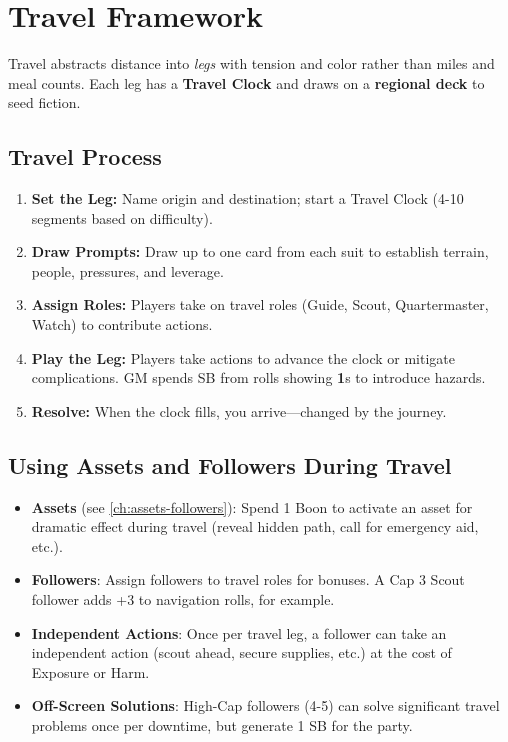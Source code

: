\section{Travel Framework}
\label{sec:travel-framework}

Travel abstracts distance into \emph{legs} with tension and color rather than miles and meal counts. Each leg has a \textbf{Travel Clock} and draws on a \textbf{regional deck} to seed fiction.

\subsection*{Travel Process}
\label{sec:travel-process}
\begin{enumerate}
\item \textbf{Set the Leg:} Name origin and destination; start a Travel Clock (4-10 segments based on difficulty).
\item \textbf{Draw Prompts:} Draw up to one card from each suit to establish terrain, people, pressures, and leverage.
\item \textbf{Assign Roles:} Players take on travel roles (Guide, Scout, Quartermaster, Watch) to contribute actions.
\item \textbf{Play the Leg:} Players take actions to advance the clock or mitigate complications. GM spends SB from rolls showing \textbf{1}s to introduce hazards.
\item \textbf{Resolve:} When the clock fills, you arrive—changed by the journey.
\end{enumerate}

\subsection*{Using Assets and Followers During Travel}
\label{sec:travel-assets}
\begin{itemize}
\item \textbf{Assets} (see \ref{ch:assets-followers}): Spend 1 Boon to activate an asset for dramatic effect during travel (reveal hidden path, call for emergency aid, etc.).
\item \textbf{Followers}: Assign followers to travel roles for bonuses. A Cap 3 Scout follower adds +3 to navigation rolls, for example.
\item \textbf{Independent Actions}: Once per travel leg, a follower can take an independent action (scout ahead, secure supplies, etc.) at the cost of Exposure or Harm.
\item \textbf{Off-Screen Solutions}: High-Cap followers (4-5) can solve significant travel problems once per downtime, but generate 1 SB for the party.
\end{itemize}

